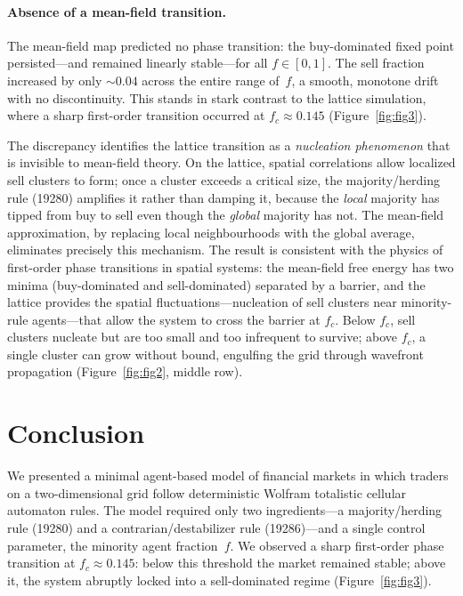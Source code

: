 \documentclass{article}
\theoremstyle{definition}
\theoremstyle{remark}
\begin{document}
\paragraph{Absence of a mean-field transition.}
The mean-field map predicted no phase transition: the buy-dominated fixed point
persisted---and remained linearly stable---for all $f \in [0,1]$. The sell fraction
increased by only ${\sim}0.04$ across the entire range of~$f$, a smooth, monotone
drift with no discontinuity. This stands in stark contrast to the lattice simulation,
where a sharp first-order transition occurred at $f_c \approx 0.145$
(Figure~\ref{fig:fig3}).

The discrepancy identifies the lattice transition as a \emph{nucleation phenomenon}
that is invisible to mean-field theory. On the lattice, spatial correlations allow
localized sell clusters to form; once a cluster exceeds a critical size, the
majority/herding rule (19280) amplifies it rather than damping it, because the
\emph{local} majority has tipped from buy to sell even though the \emph{global}
majority has not. The mean-field approximation, by replacing local neighbourhoods with
the global average, eliminates precisely this mechanism. The result is consistent with
the physics of first-order phase transitions in spatial systems: the mean-field free
energy has two minima (buy-dominated and sell-dominated) separated by a barrier, and
the lattice provides the spatial fluctuations---nucleation of sell clusters near
minority-rule agents---that allow the system to cross the barrier at $f_c$. Below
$f_c$, sell clusters nucleate but are too small and too infrequent to survive; above
$f_c$, a single cluster can grow without bound, engulfing the grid through wavefront
propagation (Figure~\ref{fig:fig2}, middle row).


\section{Conclusion}
\label{sec:conclusion}

We presented a minimal agent-based model of financial markets in which traders on a
two-dimensional grid follow deterministic Wolfram totalistic cellular automaton rules.
The model required only two ingredients---a majority/herding rule (19280) and a
contrarian/destabilizer rule (19286)---and a single control parameter, the minority agent
fraction~$f$. We observed a sharp first-order phase transition at $f_c \approx 0.145$:
below this threshold the market remained stable; above it, the system abruptly locked
into a sell-dominated regime (Figure~\ref{fig:fig3}).
\end{document}
